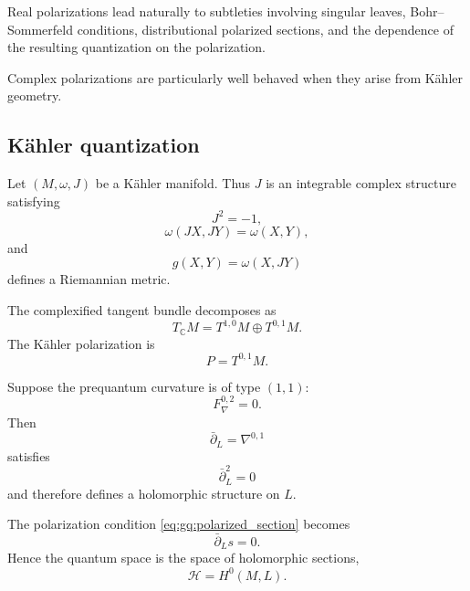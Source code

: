 \documentclass[a4paper,11pt]{article}
\theoremstyle{definition}
\newcommand{\cH}{\mathcal{H}}
\begin{document}
Real polarizations lead naturally to subtleties involving singular leaves,
Bohr--Sommerfeld conditions, distributional polarized sections, and the
dependence of the resulting quantization on the polarization.

Complex polarizations are particularly well behaved when they arise from
K\"ahler geometry.

\subsection{K\"ahler quantization}
\label{app:gq:kahler}

Let $(M,\omega,J)$ be a K\"ahler manifold.  Thus $J$ is an integrable complex
structure satisfying
\begin{equation}
    J^2=-1,
\end{equation}
\begin{equation}
    \omega(JX,JY)=\omega(X,Y),
\end{equation}
and
\begin{equation}
    g(X,Y)
    =
    \omega(X,JY)
\end{equation}
defines a Riemannian metric.

The complexified tangent bundle decomposes as
\begin{equation}
    T_\mathbb C M
    =
    T^{1,0}M
    \oplus
    T^{0,1}M.
\end{equation}
The K\"ahler polarization is
\begin{equation}
    P=T^{0,1}M.
\end{equation}

Suppose the prequantum curvature is of type $(1,1)$:
\begin{equation}
    F_\nabla^{0,2}=0.
\end{equation}
Then
\begin{equation}
    \bar\partial_L
    =
    \nabla^{0,1}
\end{equation}
satisfies
\begin{equation}
    \bar\partial_L^2=0
\end{equation}
and therefore defines a holomorphic structure on $L$.

The polarization condition
\eqref{eq:gq:polarized_section} becomes
\begin{equation}
    \bar\partial_Ls=0.
\end{equation}
Hence the quantum space is the space of holomorphic sections,
\begin{equation}
    \boxed{
    \cH
    =
    H^0(M,L).
    }
\end{equation}
\end{document}
